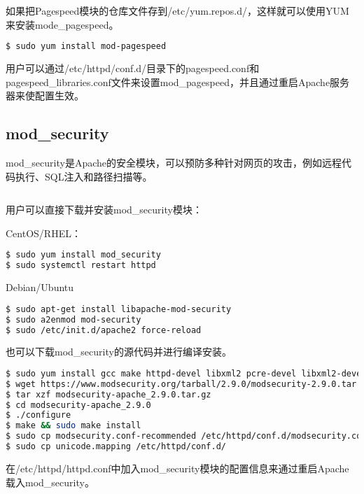 如果把Pagespeed模块的仓库文件存到/etc/yum.repos.d/，这样就可以使用YUM来安装mode\_pagespeed。

\begin{lstlisting}[language=bash]
$ sudo yum install mod-pagespeed
\end{lstlisting}

用户可以通过/etc/httpd/conf.d/目录下的pagespeed.conf和pagespeed\_libraries.conf文件来设置mod\_pagespeed，并且通过重启Apache服务器来使配置生效。


\subsection{mod\_security}

mod\_security是Apache的安全模块，可以预防多种针对网页的攻击，例如远程代码执行、SQL注入和路径扫描等。




\begin{lstlisting}[language=bash]

\end{lstlisting}

用户可以直接下载并安装mod\_security模块：

CentOS/RHEL：


\begin{lstlisting}[language=bash]
$ sudo yum install mod_security
$ sudo systemctl restart httpd
\end{lstlisting}



Debian/Ubuntu

\begin{lstlisting}[language=bash]
$ sudo apt-get install libapache-mod-security
$ sudo a2enmod mod-security
$ sudo /etc/init.d/apache2 force-reload
\end{lstlisting}


也可以下载mod\_security的源代码并进行编译安装。


\begin{lstlisting}[language=bash]
$ sudo yum install gcc make httpd-devel libxml2 pcre-devel libxml2-devel curl-devel git
$ wget https://www.modsecurity.org/tarball/2.9.0/modsecurity-2.9.0.tar.gz
$ tar xzf modsecurity-apache_2.9.0.tar.gz
$ cd modsecurity-apache_2.9.0
$ ./configure
$ make && sudo make install
$ sudo cp modsecurity.conf-recommended /etc/httpd/conf.d/modsecurity.conf
$ sudo cp unicode.mapping /etc/httpd/conf.d/
\end{lstlisting}


在/etc/httpd/httpd.conf中加入mod\_security模块的配置信息来通过重启Apache载入mod\_security。


